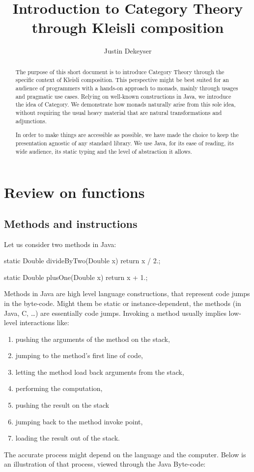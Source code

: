 \documentclass[12pt,a4paper]{report}
\author{Justin Dekeyser}
\title{Introduction to Category Theory through Kleisli composition}
\renewcommand{\baselinestretch}{1.5}
\theoremstyle{theorem}
\theoremstyle{definition}
\begin{document}
\maketitle
\tableofcontents

\begin{abstract}
The purpose of this short document is to introduce
Category Theory through the specific context of Kleisli composition.
This perspective might be best suited for an audience of
programmers with a hands-on approach to monads, mainly through usages
and pragmatic use cases. Relying on well-known constructions in Java,
we introduce the idea of Category. We demonstrate how monads naturally
arise from this sole idea, without requiring the usual heavy material
that are natural transformations and adjunctions.

In order to make things are accessible as possible,
we have made the choice to keep the presentation agnostic of any
standard library. We use Java, for its ease of reading, its wide audience,
its static typing and the level of abstraction it allows.
\end{abstract}

\chapter{Review on functions}

\section{Methods and instructions}

Let us consider two methods in Java:

\renewcommand{\baselinestretch}{1} 
\selectfont
\begin{javacode}
static Double divideByTwo(Double x)
  { return x / 2.; }

static Double plusOne(Double x)
  { return x + 1.; }
\end{javacode}
\renewcommand{\baselinestretch}{1.5} 
\selectfont

Methods in Java are high level language constructions,
that represent code jumps in the byte-code. Might them be static
or instance-dependent, the methods (in Java, C, \ldots) are essentially
code jumps. Invoking a method
usually implies low-level interactions like:
\begin{enumerate}
	\item pushing the arguments of the method on the stack,
	\item jumping to the method's first line of code,
	\item letting the method load back arguments from the stack,
	\item performing the computation,
	\item pushing the result on the stack
	\item jumping back to the method invoke point,
	\item loading the result out of the stack.
\end{enumerate}
The accurate process might depend on the language and the computer.
Below is an illustration of that process, viewed through the Java Byte-code:
\end{document}
